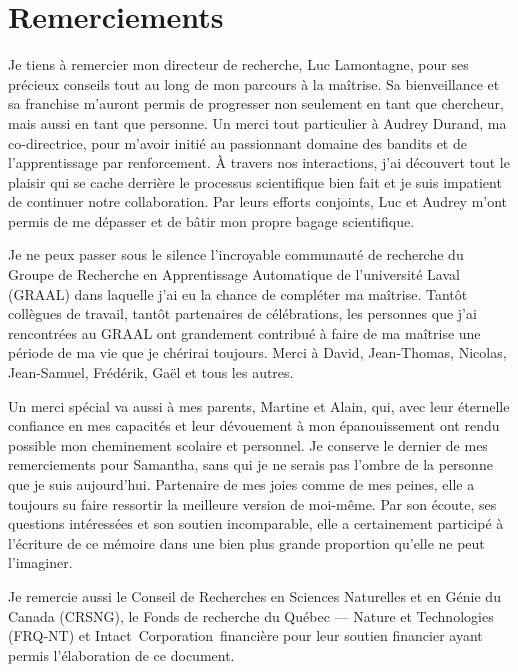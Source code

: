 \chapter*{Remerciements}        %
\label{chap:remerciements}      %

Je tiens à remercier mon directeur de recherche, Luc Lamontagne,
pour ses précieux conseils tout au long de mon parcours à la maîtrise.
Sa bienveillance et sa franchise m'auront permis de progresser non 
seulement en tant que chercheur, mais aussi en tant que personne.
Un merci tout particulier à Audrey Durand, ma co-directrice, pour m'avoir initié 
au passionnant domaine des bandits et de l'apprentissage par renforcement.
À travers nos interactions, j'ai découvert tout le plaisir 
qui se cache derrière le processus scientifique bien fait et je suis
impatient de continuer notre collaboration.
Par leurs efforts conjoints, Luc et Audrey m'ont permis de me 
dépasser et de bâtir mon propre bagage scientifique.

Je ne peux passer sous le silence l'incroyable communauté de recherche 
du Groupe de Recherche en Apprentissage Automatique 
de l'université Laval (GRAAL) dans laquelle j'ai eu la chance de compléter 
ma maîtrise.
Tantôt collègues de travail, tantôt partenaires de célébrations, les 
personnes que j'ai rencontrées au GRAAL ont grandement contribué 
à faire de ma maîtrise une période de ma vie que je chérirai toujours.
Merci à David, Jean-Thomas, Nicolas, Jean-Samuel, Frédérik, Gaël
et tous les autres.

Un merci spécial va aussi à mes parents, Martine et Alain, qui, avec leur éternelle confiance en 
mes capacités et leur dévouement à mon épanouissement ont rendu possible
mon cheminement scolaire et personnel.
Je conserve le dernier de mes remerciements pour Samantha, sans qui je ne serais pas 
l'ombre de la personne que je suis aujourd'hui. 
Partenaire de mes joies comme de mes peines, elle a toujours su faire ressortir 
la meilleure version de moi-même.
Par son écoute, ses questions intéressées et son soutien incomparable,
elle a certainement participé à l'écriture de ce mémoire dans une bien plus grande
proportion qu'elle ne peut l'imaginer.

Je remercie aussi le Conseil de Recherches en Sciences Naturelles et en Génie du Canada
(CRSNG), le Fonds de recherche du Québec — Nature et Technologies (FRQ-NT)
et Intact~Corporation~financière pour leur soutien financier ayant permis l'élaboration de ce document.